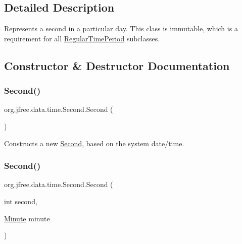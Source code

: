 \subsection{Detailed Description}
Represents a second in a particular day. This class is immutable, which is a requirement for all \mbox{\hyperlink{classorg_1_1jfree_1_1data_1_1time_1_1_regular_time_period}{Regular\+Time\+Period}} subclasses. 

\subsection{Constructor \& Destructor Documentation}
\mbox{\label{classorg_1_1jfree_1_1data_1_1time_1_1_second_a98b0191197851ed1fb2a351481ba4c08}} 
\subsubsection{\texorpdfstring{Second()}{Second()}\hspace{0.1cm}{\footnotesize\ttfamily [1/6]}}
{\footnotesize\ttfamily org.\+jfree.\+data.\+time.\+Second.\+Second (\begin{DoxyParamCaption}{ }\end{DoxyParamCaption})}

Constructs a new \mbox{\hyperlink{classorg_1_1jfree_1_1data_1_1time_1_1_second}{Second}}, based on the system date/time. \mbox{\label{classorg_1_1jfree_1_1data_1_1time_1_1_second_a120110e2361f440be3cb36c107f43898}} 
\subsubsection{\texorpdfstring{Second()}{Second()}\hspace{0.1cm}{\footnotesize\ttfamily [2/6]}}
{\footnotesize\ttfamily org.\+jfree.\+data.\+time.\+Second.\+Second (\begin{DoxyParamCaption}\item[{int}]{second,  }\item[{\mbox{\hyperlink{classorg_1_1jfree_1_1data_1_1time_1_1_minute}{Minute}}}]{minute }\end{DoxyParamCaption})}

